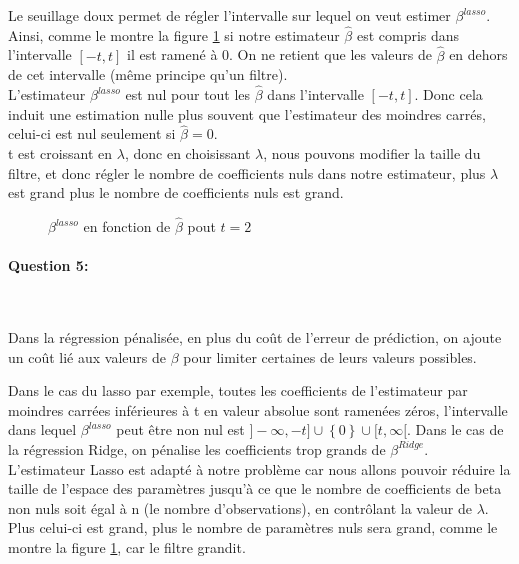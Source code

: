\documentclass{article}
\begin{document}
	Le seuillage doux permet de régler l'intervalle sur lequel on veut estimer $\beta^{lasso}$. Ainsi, comme le montre la figure \ref{fig:beta_lasso_fenetre} si notre estimateur $\hat{\beta}$ est compris dans l'intervalle $[-t,t]$ il est ramené à 0. On ne retient que les valeurs de $\hat{\beta}$ en dehors de cet intervalle (même principe qu'un filtre).
	\\L'estimateur $\beta^{lasso}$ est nul pour tout les $\hat{\beta}$ dans l'intervalle $[-t,t]$. Donc cela induit une estimation nulle plus souvent que l'estimateur des moindres carrés, celui-ci est nul seulement si $\hat{\beta} = 0$.
	\\t est croissant en $\lambda$, donc en choisissant $\lambda$, nous pouvons modifier la taille du filtre, et donc régler le nombre de coefficients nuls dans notre estimateur, plus $\lambda$ est grand plus le nombre de coefficients nuls est grand.
	
	\begin{figure}
		\centering
		\caption{$\beta^{lasso}$ en fonction de $\hat{\beta}$ pout $t=2$}
		\label{fig:beta_lasso_fenetre}
	\end{figure}
	
	\paragraph{Question 5:}
	~\par
	Dans la régression pénalisée, en plus du coût de l'erreur de prédiction, on ajoute un coût lié aux valeurs de $\beta$ pour limiter certaines de leurs valeurs possibles. 
	
	Dans le cas du lasso par exemple, toutes les coefficients de l'estimateur par moindres carrées inférieures à t en valeur absolue sont ramenées  zéros, l'intervalle dans lequel $\beta^{lasso}$ peut être non nul est $]-\infty,-t] \cup \left\lbrace0\right\rbrace \cup [t,\infty[$. Dans le cas de la régression Ridge, on pénalise les coefficients trop grands de $\beta^{Ridge}$.
	\vspace{2mm} %
	\\L'estimateur Lasso est adapté à notre problème car nous allons pouvoir réduire la taille de l'espace des paramètres jusqu'à ce que le nombre de coefficients de beta non nuls soit égal à n (le nombre d'observations), en contrôlant la valeur de $\lambda$. Plus celui-ci est grand, plus le nombre de paramètres nuls sera grand, comme le montre la figure \ref{fig:beta_lasso_fenetre}, car le filtre grandit.
	
\end{document}
